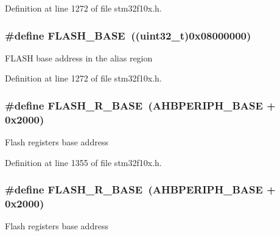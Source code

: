 Definition at line 1272 of file stm32f10x.\+h.

\subsubsection[{\texorpdfstring{F\+L\+A\+S\+H\+\_\+\+B\+A\+SE}{FLASH_BASE}}]{\setlength{\rightskip}{0pt plus 5cm}\#define F\+L\+A\+S\+H\+\_\+\+B\+A\+SE~(({\bf uint32\+\_\+t})0x08000000)}\hypertarget{group___peripheral__memory__map_ga23a9099a5f8fc9c6e253c0eecb2be8db}{}\label{group___peripheral__memory__map_ga23a9099a5f8fc9c6e253c0eecb2be8db}
F\+L\+A\+SH base address in the alias region 

Definition at line 1272 of file stm32f10x.\+h.

\subsubsection[{\texorpdfstring{F\+L\+A\+S\+H\+\_\+\+R\+\_\+\+B\+A\+SE}{FLASH_R_BASE}}]{\setlength{\rightskip}{0pt plus 5cm}\#define F\+L\+A\+S\+H\+\_\+\+R\+\_\+\+B\+A\+SE~({\bf A\+H\+B\+P\+E\+R\+I\+P\+H\+\_\+\+B\+A\+SE} + 0x2000)}\hypertarget{group___peripheral__memory__map_ga8e21f4845015730c5731763169ec0e9b}{}\label{group___peripheral__memory__map_ga8e21f4845015730c5731763169ec0e9b}
Flash registers base address 

Definition at line 1355 of file stm32f10x.\+h.

\subsubsection[{\texorpdfstring{F\+L\+A\+S\+H\+\_\+\+R\+\_\+\+B\+A\+SE}{FLASH_R_BASE}}]{\setlength{\rightskip}{0pt plus 5cm}\#define F\+L\+A\+S\+H\+\_\+\+R\+\_\+\+B\+A\+SE~({\bf A\+H\+B\+P\+E\+R\+I\+P\+H\+\_\+\+B\+A\+SE} + 0x2000)}\hypertarget{group___peripheral__memory__map_ga8e21f4845015730c5731763169ec0e9b}{}\label{group___peripheral__memory__map_ga8e21f4845015730c5731763169ec0e9b}
Flash registers base address 

